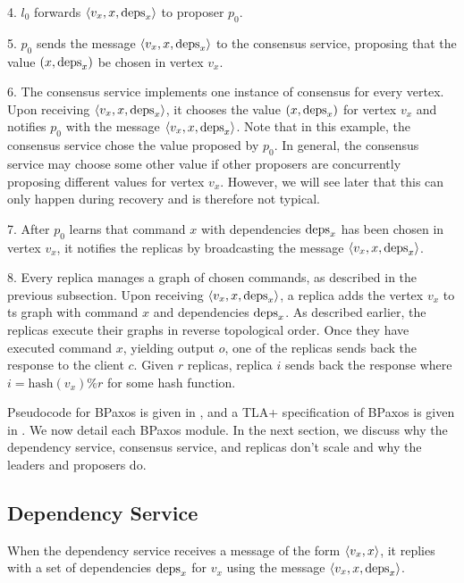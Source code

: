 4. $l_0$ forwards $\langle v_x, x, \text{deps}_x \rangle$ to proposer $p_0$.

5. $p_0$ sends the message $\langle v_x, x, \text{deps}_x \rangle$ to the consensus service,
proposing that the value $(x, \text{deps}_x)$ be chosen in vertex $v_x$.

6. The consensus service implements one instance of consensus for every vertex.
Upon receiving $\langle v_x, x, \text{deps}_x \rangle$, it chooses the value $(x, \text{deps}_x)$
for vertex $v_x$ and notifies $p_0$ with the message $\langle v_x, x, \text{deps}_x \rangle$.
Note that in this example, the consensus service chose the value proposed by
$p_0$. In general, the consensus service may choose some other value if other
proposers are concurrently proposing different values for vertex $v_x$.
However, we will see later that this can only happen during recovery and is
therefore not typical.

7. After $p_0$ learns that command $x$ with dependencies $\text{deps}_x$ has been
chosen in vertex $v_x$, it notifies the replicas by broadcasting the message
$\langle v_x, x, \text{deps}_x \rangle$.

8. Every replica manages a graph of chosen commands, as described in the
previous subsection. Upon receiving $\langle v_x, x, \text{deps}_x \rangle$, a replica adds
the vertex $v_x$ to ts graph with command $x$ and dependencies $\text{deps}_x$.
As described earlier, the replicas execute their graphs in reverse topological
order. Once they have executed command $x$, yielding output $o$, one of the
replicas sends back the response to the client $c$. Given $r$ replicas, replica
$i$ sends back the response where $i = \text{hash}(v_x) \% r$ for some hash
function.

Pseudocode for BPaxos is given in , and a TLA+
specification of BPaxos is given in . We now detail each BPaxos
module. In the next section, we discuss why the dependency service, consensus
service, and replicas don't scale and why the leaders and proposers do.

{}
{}

\subsection{Dependency Service}
When the dependency service receives a message of the form $\langle v_x, x \rangle$, it
replies with a set of dependencies $\text{deps}_x$ for $v_x$ using the message
$\langle v_x, x, \text{deps}_x \rangle$.

